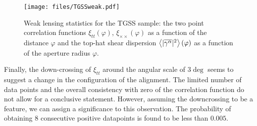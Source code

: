		\begin{figure}
			\texttt{[image: files/TGSSweak.pdf]}
			\caption{Weak lensing statistics for the TGSS sample: the two point correlation functions $\xi_{tt}(\varphi)$, $\xi_{\times \times}(\varphi)$ as a function of the distance $\varphi$ and the top-hat shear dispersion $\left\langle |\overline{\gamma^\alpha}|^2 \right\rangle(\varphi)$ as a function of the aperture radius $\varphi$.}
			
			\label{fig:TGSSweak}
		\end{figure}		
	
			Finally, the down-crossing of $\xi_{tt}$ around the angular scale of $3\deg$ seems to suggest a change in the configuration of the alignment. The limited number of data points and the overall consistency with zero of the correlation function do not allow for a conclusive statement. However, assuming the downcrossing to be a feature, we can assign a significance to this observation. The probability of obtaining $8$ consecutive positive datapoints is found to be less than $0.005$. 